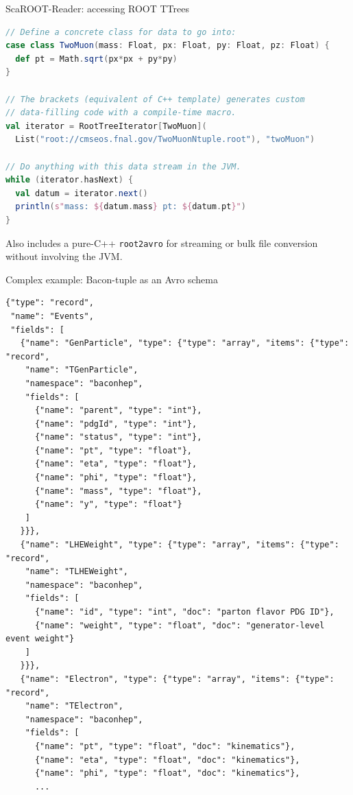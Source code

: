 \documentclass{beamer}
\begin{document}
\begin{frame}[fragile]{ScaROOT-Reader: accessing ROOT TTrees}
\vfill
{}

\vfill
\begin{minipage}{1.05\linewidth}
\begin{lstlisting}[language=scala]
// Define a concrete class for data to go into:
case class TwoMuon(mass: Float, px: Float, py: Float, pz: Float) {
  def pt = Math.sqrt(px*px + py*py)
}

// The brackets (equivalent of C++ template) generates custom
// data-filling code with a compile-time macro.
val iterator = RootTreeIterator[TwoMuon](
  List("root://cmseos.fnal.gov/TwoMuonNtuple.root"), "twoMuon")

// Do anything with this data stream in the JVM.
while (iterator.hasNext) {
  val datum = iterator.next()
  println(s"mass: ${datum.mass} pt: ${datum.pt}")
}
\end{lstlisting}
\end{minipage}

Also includes a pure-C++ {\tt root2avro} for streaming or bulk file conversion without involving the JVM.
\end{frame}

\begin{frame}[fragile]{Complex example: Bacon-tuple as an Avro schema}
\tiny
\begin{verbatim}
{"type": "record",
 "name": "Events",
 "fields": [
   {"name": "GenParticle", "type": {"type": "array", "items": {"type": "record",
    "name": "TGenParticle",
    "namespace": "baconhep",
    "fields": [
      {"name": "parent", "type": "int"},
      {"name": "pdgId", "type": "int"},
      {"name": "status", "type": "int"},
      {"name": "pt", "type": "float"},
      {"name": "eta", "type": "float"},
      {"name": "phi", "type": "float"},
      {"name": "mass", "type": "float"},
      {"name": "y", "type": "float"}
    ]
   }}},
   {"name": "LHEWeight", "type": {"type": "array", "items": {"type": "record",
    "name": "TLHEWeight",
    "namespace": "baconhep",
    "fields": [
      {"name": "id", "type": "int", "doc": "parton flavor PDG ID"},
      {"name": "weight", "type": "float", "doc": "generator-level event weight"}
    ]
   }}},
   {"name": "Electron", "type": {"type": "array", "items": {"type": "record",
    "name": "TElectron",
    "namespace": "baconhep",
    "fields": [
      {"name": "pt", "type": "float", "doc": "kinematics"},
      {"name": "eta", "type": "float", "doc": "kinematics"},
      {"name": "phi", "type": "float", "doc": "kinematics"},
      ...
\end{verbatim}
\end{frame}
\end{document}
